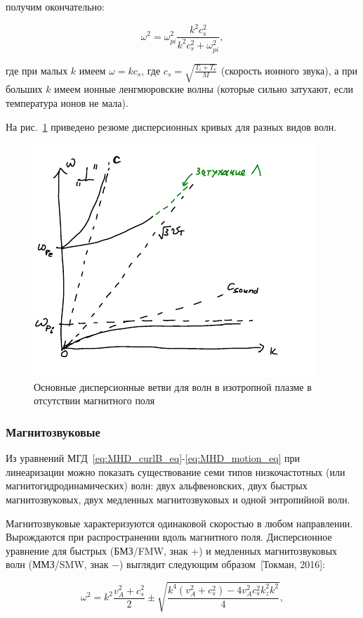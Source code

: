 \documentclass[10pt, a4paper]{article}
\newcommand{\Tokman}{~[Токман, 2016]}
\begin{document}
получим окончательно:

\begin{equation*}
	\omega^2 = \omega_{pi}^2\frac{k^2c_s^2}{k^2c_s^2 + \omega_{pi}^2},
\end{equation*}

где при малых $k$ имеем $\omega=k c_s$, где $c_s=\sqrt{\frac{T_i + T_e}{M}}$ (скорость ионного звука), а при больших $k$ имеем ионные ленгмюровские волны (которые сильно затухают, если температура ионов не мала).

На рис.~\ref{fig:disp_eq_without_B} приведено резюме дисперсионных кривых для разных видов волн.

\begin{figure}[ht]
	\begin{center}
		\includegraphics[width = 0.5\linewidth]{noB.pdf}
	\end{center}
	\caption{Основные дисперсионные ветви для волн в изотропной плазме в отсутствии магнитного поля}
	\label{fig:disp_eq_without_B} 
\end{figure}

\subsubsection{Магнитозвуковые}

Из уравнений МГД~\eqref{eq:MHD_curlB_eq}-\eqref{eq:MHD_motion_eq} при линеаризации можно показать существование семи типов низкочастотных (или магнитогидродинамических) волн: двух альфвеновских, двух быстрых магнитозвуковых, двух медленных магнитозвуковых и одной энтропийной волн. 

Магнитозвуковые характеризуются одинаковой скоростью в любом направлении. Вырождаются при распространении вдоль магнитного поля. Дисперсионное уравнение для быстрых (БМЗ/FMW, знак $+$) и медленных магнитозвуковых волн (ММЗ/SMW, знак $-$) выглядит следующим образом\Tokman:

\begin{equation*}
	\omega^2 = k^2\frac{v_A^2+c_s^2}{2}\pm\sqrt{\frac{k^4(v_A^2+c_s^2) - 4v_A^2c_s^2k_z^2k^2}{4}},
\end{equation*}
\end{document}
